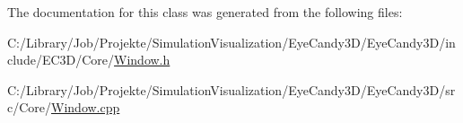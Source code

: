 The documentation for this class was generated from the following files\+:\begin{DoxyCompactItemize}
\item 
C\+:/\+Library/\+Job/\+Projekte/\+Simulation\+Visualization/\+Eye\+Candy3\+D/\+Eye\+Candy3\+D/include/\+E\+C3\+D/\+Core/\mbox{\hyperlink{_window_8h}{Window.\+h}}\item 
C\+:/\+Library/\+Job/\+Projekte/\+Simulation\+Visualization/\+Eye\+Candy3\+D/\+Eye\+Candy3\+D/src/\+Core/\mbox{\hyperlink{_window_8cpp}{Window.\+cpp}}\end{DoxyCompactItemize}
